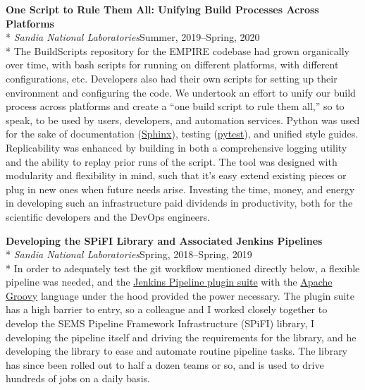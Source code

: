 \documentclass[margin,line,pifont,palatino,10pt]{res}
\begin{document}
\begin{resume}
{\bf One Script to Rule Them All:  Unifying Build Processes Across Platforms}\\*
{\it Sandia National Laboratories}\hfill Summer, 2019--Spring, 2020\\*
The BuildScripts repository for the EMPIRE codebase had grown organically over time, with bash scripts for running on different platforms, with different configurations, etc.  Developers also had their own scripts for setting up their environment and configuring the code.  We undertook an effort to unify our build process across platforms and create a ``one build script to rule them all,'' so to speak, to be used by users, developers, and automation services.  Python was used for the sake of documentation (\href{https://www.sphinx-doc.org/en/master/}{Sphinx}), testing (\href{https://docs.pytest.org/en/latest/}{pytest}), and unified style guides.  Replicability was enhanced by building in both a comprehensive logging utility and the ability to replay prior runs of the script.  The tool was designed with modularity and flexibility in mind, such that it's easy extend existing pieces or plug in new ones when future needs arise.  Investing the time, money, and energy in developing such an infrastructure paid dividends in productivity, both for the scientific developers and the DevOps engineers.

{\bf Developing the SPiFI Library and Associated Jenkins Pipelines}\\*
{\it Sandia National Laboratories}\hfill Spring, 2018--Spring, 2019\\*
In order to adequately test the git workflow mentioned directly below, a flexible pipeline was needed, and the \href{https://www.jenkins.io/doc/book/pipeline/}{Jenkins Pipeline plugin suite} with the \href{https://groovy-lang.org}{Apache Groovy} language under the hood provided the power necessary.  The plugin suite has a high barrier to entry, so a colleague and I worked closely together to develop the SEMS Pipeline Framework Infrastructure (SPiFI) library, I developing the pipeline itself and driving the requirements for the library, and he developing the library to ease and automate routine pipeline tasks.  The library has since been rolled out to half a dozen teams or so, and is used to drive hundreds of jobs on a daily basis.


\end{resume}
\end{document}
